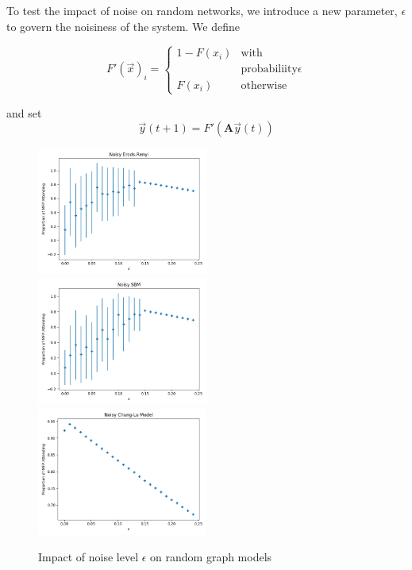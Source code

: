 \documentclass[12pt]{article}
\begin{document}
To test the impact of noise on random networks, we introduce a new parameter, $\epsilon$ to govern the noisiness of the system.  We define

\begin{equation}
  F'(\vec{x})_i = \begin{cases}
    1 - F(x_i) &\text{with} \\
    & \text{probabiliity} \epsilon \\
    F(x_i) &\text{otherwise}
  \end{cases}
\end{equation}

and set
\begin{equation}
  \vec{y}(t + 1) = F'(\mathbf{A}\vec{y}(t))
\end{equation}

\begin{figure}
  \includegraphics[width=0.5\textwidth]{noisy_erdos_renyi.png}
  \includegraphics[width=0.5\textwidth]{noisy_sbm.png}
  \includegraphics[width=0.5\textwidth]{noisy_chung_lu.png}
  \caption{Impact of noise level $\epsilon$ on random graph models}
\end{figure}
\end{document}
